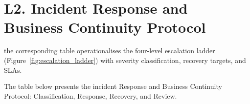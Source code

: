 
\section*{L2. Incident Response and Business Continuity Protocol}
\label{sec:appl_incident}

the corresponding table operationalises the four-level escalation ladder (Figure~\ref{fig:escalation_ladder}) with severity classification, recovery targets, and SLAs.

\noindent The table below presents the incident Response and Business Continuity Protocol: Classification, Response, Recovery, and Review.

